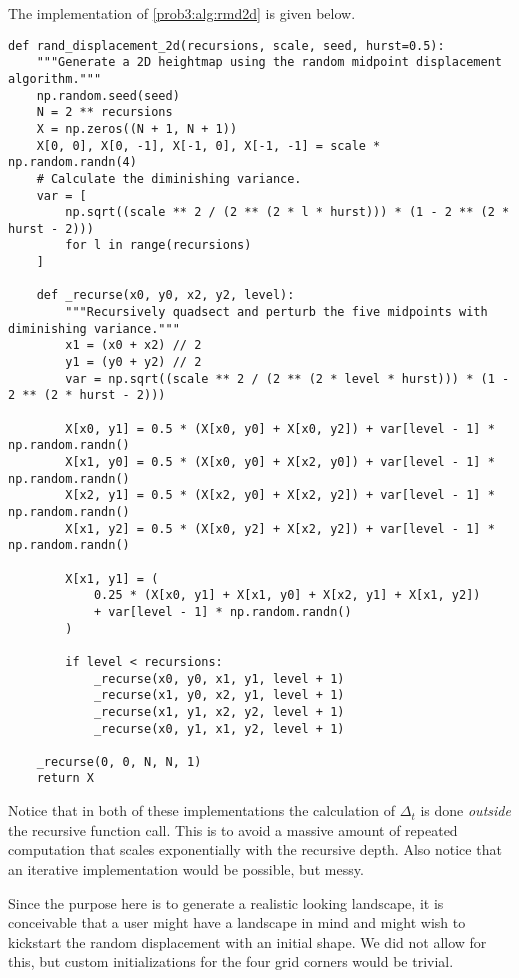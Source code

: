 The implementation of \autoref{prob3:alg:rmd2d} is given below.

\begin{verbatim}
def rand_displacement_2d(recursions, scale, seed, hurst=0.5):
    """Generate a 2D heightmap using the random midpoint displacement algorithm."""
    np.random.seed(seed)
    N = 2 ** recursions
    X = np.zeros((N + 1, N + 1))
    X[0, 0], X[0, -1], X[-1, 0], X[-1, -1] = scale * np.random.randn(4)
    # Calculate the diminishing variance.
    var = [
        np.sqrt((scale ** 2 / (2 ** (2 * l * hurst))) * (1 - 2 ** (2 * hurst - 2)))
        for l in range(recursions)
    ]

    def _recurse(x0, y0, x2, y2, level):
        """Recursively quadsect and perturb the five midpoints with diminishing variance."""
        x1 = (x0 + x2) // 2
        y1 = (y0 + y2) // 2
        var = np.sqrt((scale ** 2 / (2 ** (2 * level * hurst))) * (1 - 2 ** (2 * hurst - 2)))

        X[x0, y1] = 0.5 * (X[x0, y0] + X[x0, y2]) + var[level - 1] * np.random.randn()
        X[x1, y0] = 0.5 * (X[x0, y0] + X[x2, y0]) + var[level - 1] * np.random.randn()
        X[x2, y1] = 0.5 * (X[x2, y0] + X[x2, y2]) + var[level - 1] * np.random.randn()
        X[x1, y2] = 0.5 * (X[x0, y2] + X[x2, y2]) + var[level - 1] * np.random.randn()

        X[x1, y1] = (
            0.25 * (X[x0, y1] + X[x1, y0] + X[x2, y1] + X[x1, y2])
            + var[level - 1] * np.random.randn()
        )

        if level < recursions:
            _recurse(x0, y0, x1, y1, level + 1)
            _recurse(x1, y0, x2, y1, level + 1)
            _recurse(x1, y1, x2, y2, level + 1)
            _recurse(x0, y1, x1, y2, level + 1)

    _recurse(0, 0, N, N, 1)
    return X
\end{verbatim}

Notice that in both of these implementations the calculation of $\Delta_t$ is done \textit{outside} the recursive function call.
This is to avoid a massive amount of repeated computation that scales exponentially with the recursive depth.
Also notice that an iterative implementation would be possible, but messy.

Since the purpose here is to generate a realistic looking landscape, it is conceivable that a user might have a landscape in mind and might wish to kickstart the random displacement with an initial shape.
We did not allow for this, but custom initializations for the four grid corners would be trivial.

